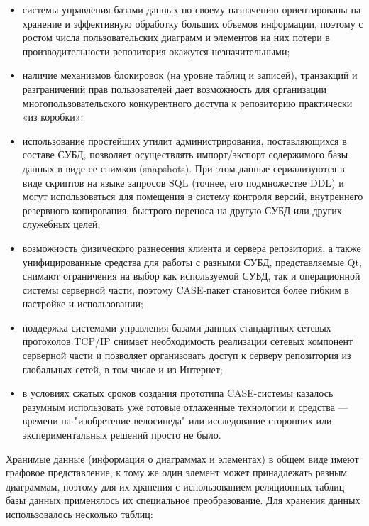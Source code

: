 \documentclass[a5paper]{article}
\begin{document}
\begin{itemize}
  \item системы управления базами данных по своему назначению ориентированы на
	хранение и эффективную обработку больших объемов информации, поэтому с
	ростом числа пользовательских диаграмм и элементов на них потери в
	производительности репозитория окажутся незначительными;
  \item наличие механизмов блокировок (на уровне таблиц и записей), транзакций и
	разграничений прав пользователей дает возможность для организации
	многопользовательского конкурентного доступа к репозиторию практически
	«из коробки»;
  \item использование простейших утилит администрирования, поставляющихся в
	составе СУБД, позволяет осуществлять импорт/экспорт содержимого базы
	данных в виде ее снимков (snapshots). При
	этом данные сериализуются в виде скриптов на языке запросов
	SQL (точнее, его подмножестве DDL) и могут использоваться для помещения в
	систему контроля версий, внутреннего резервного копирования, быстрого
	переноса на другую СУБД или других служебных целей;
  \item возможность физического разнесения клиента и сервера репозитория, а
	также унифицированные средства для работы с разными СУБД,
	представляемые Qt, снимают
	ограничения на выбор как используемой СУБД, так и операционной системы
	серверной части, поэтому CASE-пакет
	становится более гибким в настройке и использовании;
  \item поддержка системами управления базами данных стандартных сетевых
	протоколов TCP/IP снимает необходимость реализации сетевых компонент серверной части и
	позволяет организовать доступ к серверу репозитория из глобальных
	сетей, в том числе и из Интернет;
  \item в условиях сжатых сроков создания прототипа
	CASE-системы казалось разумным использовать уже готовые отлаженные технологии и средства 
	--– времени на "изобретение велосипеда" или исследование сторонних или
	экспериментальных решений просто не было.
\end{itemize}

Хранимые данные (информация о диаграммах и элементах) в общем виде имеют
графовое представление, к тому же один элемент может принадлежать
разным диаграммам, поэтому для их хранения с использованием реляционных
таблиц базы данных применялось их специальное преобразование. Для
хранения данных использовалось несколько таблиц:
\end{document}
